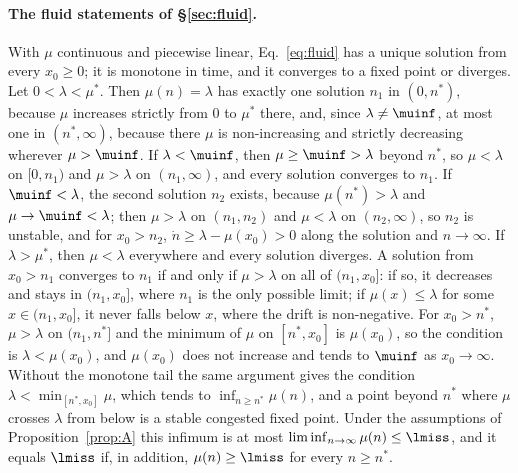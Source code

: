 \paragraph{The fluid statements of \S\ref{sec:fluid}.} With $\mu$ continuous and piecewise linear, Eq.~\eqref{eq:fluid} has a unique solution from every $x_0\ge0$; it is monotone in time, and it converges to a fixed point or diverges. Let $0<\lambda<\mu^*$. Then $\mu(n)=\lambda$ has exactly one solution $n_1$ in $(0,n^*)$, because $\mu$ increases strictly from 0 to $\mu^*$ there, and, since $\lambda\ne\muinf$, at most one in $(n^*,\infty)$, because there $\mu$ is non-increasing and strictly decreasing wherever $\mu>\muinf$. If $\lambda<\muinf$, then $\mu\ge\muinf>\lambda$ beyond $n^*$, so $\mu<\lambda$ on $[0,n_1)$ and $\mu>\lambda$ on $(n_1,\infty)$, and every solution converges to $n_1$. If $\muinf<\lambda$, the second solution $n_2$ exists, because $\mu(n^*)>\lambda$ and $\mu\to\muinf<\lambda$; then $\mu>\lambda$ on $(n_1,n_2)$ and $\mu<\lambda$ on $(n_2,\infty)$, so $n_2$ is unstable, and for $x_0>n_2$, $\dot n\ge\lambda-\mu(x_0)>0$ along the solution and $n\to\infty$. If $\lambda>\mu^*$, then $\mu<\lambda$ everywhere and every solution diverges. A solution from $x_0>n_1$ converges to $n_1$ if and only if $\mu>\lambda$ on all of $(n_1,x_0]$: if so, it decreases and stays in $(n_1,x_0]$, where $n_1$ is the only possible limit; if $\mu(x)\le\lambda$ for some $x\in(n_1,x_0]$, it never falls below $x$, where the drift is non-negative. For $x_0>n^*$, $\mu>\lambda$ on $(n_1,n^*]$ and the minimum of $\mu$ on $[n^*,x_0]$ is $\mu(x_0)$, so the condition is $\lambda<\mu(x_0)$, and $\mu(x_0)$ does not increase and tends to $\muinf$ as $x_0\to\infty$. Without the monotone tail the same argument gives the condition $\lambda<\min_{[n^*,x_0]}\mu$, which tends to $\inf_{n\ge n^*}\mu(n)$, and a point beyond $n^*$ where $\mu$ crosses $\lambda$ from below is a stable congested fixed point. Under the assumptions of Proposition~\ref{prop:A} this infimum is at most $\liminf_{n\to\infty}\mu(n)\le\lmiss$, and it equals $\lmiss$ if, in addition, $\mu(n)\ge\lmiss$ for every $n\ge n^*$.

